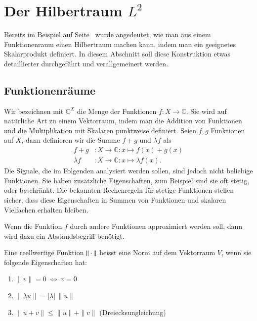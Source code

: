 %
%
%
\section{Der Hilbertraum $L^2$
\label{section:l2}}
Bereits im Beispiel auf Seite~\pageref{geometrie:l2-beispiel} wurde
angedeutet, wie man aus einem Funktionenraum einen Hilbertraum
machen kann, indem man ein geeignetes Skalarprodukt definiert.
In diesem Abschnitt soll diese Konstruktion etwas detaillierter 
durchgeführt und verallgemeinert werden.

\subsection{Funktionenräume}
Wir bezeichnen mit $\mathbb C^X$ die Menge der Funktionen
$f\colon X\to \mathbb C$.
Sie wird auf natürliche Art zu einem Vektorraum, indem man die
Addition von Funktionen und die Multiplikation mit Skalaren
punktweise definiert.
Seien $f,g$ Funktionen auf $X$, dann definieren wir die Summe $f+g$ und
$\lambda f$ als
\begin{align*}
f+g&\colon X\to\mathbb C: x \mapsto f(x) + g(x)
\\
\lambda f &\colon X \to \mathbb C: x \mapsto \lambda f(x).
\end{align*}
Die Signale, die im Folgenden analysiert werden sollen, sind jedoch
nicht beliebige Funktionen.
Sie haben zusätzliche Eigenschaften, zum Beispiel sind sie oft stetig,
oder beschränkt.
Die bekannten Rechenregeln für stetige Funktionen stellen sicher, dass
diese Eigenschaften in Summen von Funktionen und skalaren Vielfachen
erhalten bleiben.

Wenn die Funktion $f$ durch andere Funktionen approximiert werden soll,
dann wird dazu ein Abstandsbegriff benötigt.

\begin{definition}
Eine reellwertige Funktion $\|\mathstrut\cdot\mathstrut\|$ heisst
eine Norm auf dem Vektorraum $V$, wenn sie folgende Eigenschaften hat:
\begin{enumerate}
\item $\|v\|=0\;\Leftrightarrow\; v = 0$
\item $\| \lambda u \| = |\lambda| \,\|u\|$
\item $\|u + v\| \le \|u\| + \|v\|$ (Dreiecksungleichung)
\end{enumerate}
\end{definition}

